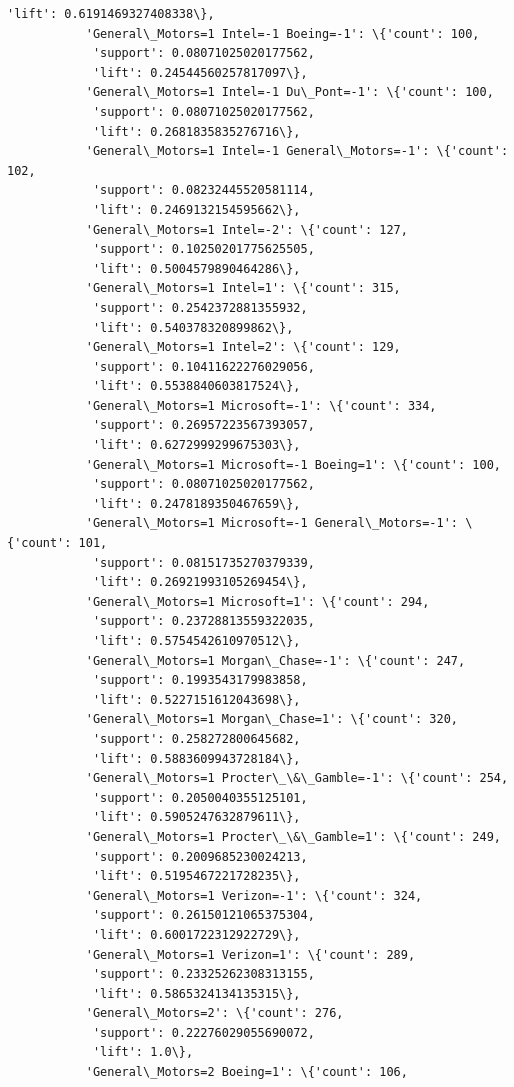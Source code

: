 \documentclass[11pt]{article}
\begin{document}
\begin{Verbatim}[commandchars=\\\{\}]
            'lift': 0.6191469327408338\},
           'General\_Motors=1 Intel=-1 Boeing=-1': \{'count': 100,
            'support': 0.08071025020177562,
            'lift': 0.24544560257817097\},
           'General\_Motors=1 Intel=-1 Du\_Pont=-1': \{'count': 100,
            'support': 0.08071025020177562,
            'lift': 0.2681835835276716\},
           'General\_Motors=1 Intel=-1 General\_Motors=-1': \{'count': 102,
            'support': 0.08232445520581114,
            'lift': 0.2469132154595662\},
           'General\_Motors=1 Intel=-2': \{'count': 127,
            'support': 0.10250201775625505,
            'lift': 0.5004579890464286\},
           'General\_Motors=1 Intel=1': \{'count': 315,
            'support': 0.2542372881355932,
            'lift': 0.540378320899862\},
           'General\_Motors=1 Intel=2': \{'count': 129,
            'support': 0.10411622276029056,
            'lift': 0.5538840603817524\},
           'General\_Motors=1 Microsoft=-1': \{'count': 334,
            'support': 0.26957223567393057,
            'lift': 0.6272999299675303\},
           'General\_Motors=1 Microsoft=-1 Boeing=1': \{'count': 100,
            'support': 0.08071025020177562,
            'lift': 0.2478189350467659\},
           'General\_Motors=1 Microsoft=-1 General\_Motors=-1': \{'count': 101,
            'support': 0.08151735270379339,
            'lift': 0.26921993105269454\},
           'General\_Motors=1 Microsoft=1': \{'count': 294,
            'support': 0.23728813559322035,
            'lift': 0.5754542610970512\},
           'General\_Motors=1 Morgan\_Chase=-1': \{'count': 247,
            'support': 0.1993543179983858,
            'lift': 0.5227151612043698\},
           'General\_Motors=1 Morgan\_Chase=1': \{'count': 320,
            'support': 0.258272800645682,
            'lift': 0.5883609943728184\},
           'General\_Motors=1 Procter\_\&\_Gamble=-1': \{'count': 254,
            'support': 0.2050040355125101,
            'lift': 0.5905247632879611\},
           'General\_Motors=1 Procter\_\&\_Gamble=1': \{'count': 249,
            'support': 0.2009685230024213,
            'lift': 0.5195467221728235\},
           'General\_Motors=1 Verizon=-1': \{'count': 324,
            'support': 0.26150121065375304,
            'lift': 0.6001722312922729\},
           'General\_Motors=1 Verizon=1': \{'count': 289,
            'support': 0.23325262308313155,
            'lift': 0.5865324134135315\},
           'General\_Motors=2': \{'count': 276,
            'support': 0.22276029055690072,
            'lift': 1.0\},
           'General\_Motors=2 Boeing=1': \{'count': 106,

\end{Verbatim}
\end{document}
